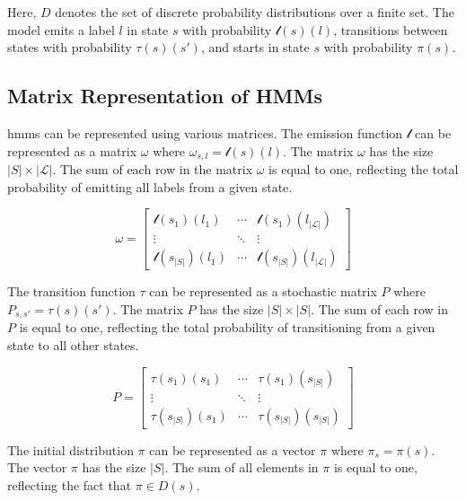 Here, $D$ denotes the set of discrete probability distributions over a finite set.
The model emits a label $l$ in state $s$ with probability $\mathscr{l}(s)(l)$, transitions between states with probability $\tau(s)(s')$, and starts in state $s$ with probability $\pi(s)$.


\subsection{Matrix Representation of HMMs}\label{subsec:matrix-representation}
\glspl{hmm} can be represented using various matrices.
The emission function $\mathscr{l}$ can be represented as a matrix $\omega$ where $\omega_{s, l} = \mathscr{l}(s)(l)$.
The matrix $\omega$ has the size $|S| \times |\mathcal{L}|$.
The sum of each row in the matrix $\omega$ is equal to one, reflecting the total probability of emitting all labels from a given state.


\[
    \omega = \begin{bmatrix}
                 \mathscr{l}(s_1)(l_1)     & \cdots & \mathscr{l}(s_1)(l_{|\mathcal{L}|})     \\
                 \vdots                    & \ddots & \vdots                                  \\
                 \mathscr{l}(s_{|S|})(l_1) & \cdots & \mathscr{l}(s_{|S|})(l_{|\mathcal{L}|})
    \end{bmatrix}
\]


The transition function $\tau$ can be represented as a stochastic matrix $P$ where $P_{s, s'} = \tau(s)(s')$.
The matrix $P$ has the size $|S| \times |S|$.
The sum of each row in $P$ is equal to one, reflecting the total probability of transitioning from a given state to all other states.

\[
    P = \begin{bmatrix}
            \tau(s_1)(s_1)     & \cdots & \tau(s_1)(s_{|S|})     \\
            \vdots             & \ddots & \vdots                 \\
            \tau(s_{|S|})(s_1) & \cdots & \tau(s_{|S|})(s_{|S|})
    \end{bmatrix}
\]

The initial distribution $\pi$ can be represented as a vector $\pi$ where $\pi_s = \pi(s)$.
The vector $\pi$ has the size $|S|$.
The sum of all elements in $\pi$ is equal to one, reflecting the fact that $\pi \in D(s)$.

